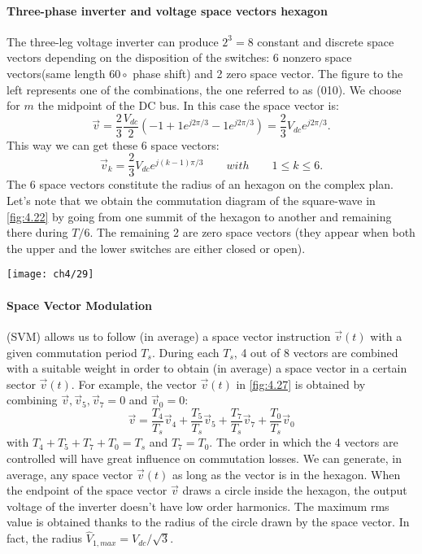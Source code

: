 		\paragraph{Three-phase inverter and voltage space vectors hexagon} \quad The three-leg voltage inverter can produce $2^3 = 8$ constant and discrete space vectors depending on the disposition of the switches: 6 nonzero space vectors(same length $60\circ$ phase shift) and 2 zero space vector. The figure to the left represents one of the combinations, the one referred to as (010). We choose for $m$ the midpoint of the DC bus. In this case the space vector is:
		\begin{equation}
			\vec{v} = \frac{2}{3} \frac{V_{dc}}{2}(-1 + 1e^{j2\pi /3}-1 e^{j2\pi /3}) = \frac{2}{3}V_{dc}e^{j2\pi /3}.
		\end{equation}
		This way we can get these 6 space vectors:
		\begin{equation}
			\vec{v}_k = \frac{2}{3}V_{dc}e^{j(k-1)\pi /3}\qquad with \qquad 1\leq k \leq 6.
		\end{equation}
		The 6 space vectors constitute the radius of an hexagon on the complex plan. Let's note that we obtain the commutation diagram of the square-wave in \autoref{fig:4.22} by going from one summit of the hexagon to another and remaining there during $T/6$. The remaining 2 are zero space vectors (they appear when both the upper and the lower switches are either closed or open). 
		\begin{center}
		\texttt{[image: ch4/29]}
		\label{fig:4.27}
		\end{center}
		
		\paragraph{Space Vector Modulation} \quad (SVM) allows us to follow (in average) a space vector instruction $\vec{v}(t)$ with a given commutation period $T_s$. During each $T_s$, 4 out of 8 vectors are combined with a suitable weight in order to obtain (in average) a space vector in a certain sector $\vec{v}(t)$. For example, the vector $\vec{v}(t)$ in \autoref{fig:4.27} is obtained by combining $\vec{v}, \vec{v}_5, \vec{v}_7 = 0$ and $\vec{v}_0 = 0$: 
		\begin{equation}
			\vec{v} = \frac{T_4}{T_s}\vec{v}_4 + \frac{T_5}{T_s}\vec{v}_5 +\frac{T_7}{T_s}\vec{v}_7+ \frac{T_0}{T_s}\vec{v}_0
		\end{equation}
		with $T_4+T_5+T_7+T_0=T_s$ and $T_7=T_0$. The order in which the 4 vectors are controlled will have great influence on commutation losses.
		We can generate, in average, any space vector $\vec{v}(t)$ as long as the vector is in the hexagon. When the endpoint of the space vector $\vec{v}$ draws a circle inside the hexagon, the output voltage of the inverter doesn't have low order harmonics. The maximum rms value is obtained thanks to the radius of the circle drawn by the space vector. In fact, the radius $\hat{V}_{1,max} = V_{dc}/\sqrt{3}$. 
		
